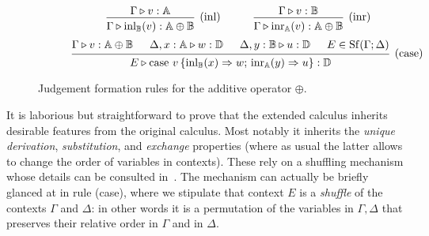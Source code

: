 \documentclass[a4paper,UKenglish,cleveref, autoref, thm-restate]{lipics-v2021}
\begin{document}
\begin{figure}[H]
    \begin{equation*}
            \hspace{60pt}
    \begin{prooftree}
        \hypo{\Gamma \vljud v: \typeA}
        \infer1[(inl)]{\Gamma \vljud \inl_{\typeB}(v): \typeA \oplus \typeB}
    \end{prooftree}
    \hspace{30pt}
    \begin{prooftree}
        \hypo{\Gamma \vljud v: \typeB}
        \infer1[(inr)]{\Gamma \vljud \inr_{\typeA}(v): \typeA \oplus \typeB}
    \end{prooftree} 
    \end{equation*}
    \begin{equation*}
            \hspace{30pt}
    \begin{prooftree}
        \hypo{\Gamma \vljud v: \typeA \oplus \typeB}
        \hypo{\Delta, x: \typeA \vljud w: \typeD}
        \hypo{\Delta, y: \typeB \vljud u: \typeD}
        \hypo{E \in \Shuff(\Gamma; \Delta)}
        \infer4[(case)]{E \vljud \text{case } v\,
        \{\inl_{\typeB}(x) 
            \Rightarrow w ; \,
          \inr_{\typeA}(y) \Rightarrow u
        \}: \typeD}
    \end{prooftree}
    \end{equation*}
    \caption{Judgement formation rules for the additive operator $\oplus$.}
    \label{fig:typing_rules_cond}
\end{figure}
It is laborious but straightforward to prove that the extended calculus
inherits desirable features from the original calculus. Most notably it
inherits the \emph{unique derivation}, \emph{substitution}, and \emph{exchange}
properties (where as usual the latter allows to change the order of variables
in contexts).  These rely on a shuffling mechanism whose details can be
consulted in~\cite{dahlqvist22,dahlqvist2023syntactic,shulman19}. The mechanism
can actually be briefly glanced at in  rule (case), where we stipulate that
context $E$ is a \emph{shuffle} of the contexts $\Gamma$ and $\Delta$: in other
words it is a permutation of the variables in $\Gamma,\Delta$ that
preserves their relative order in $\Gamma$ and in $\Delta$.
\end{document}
